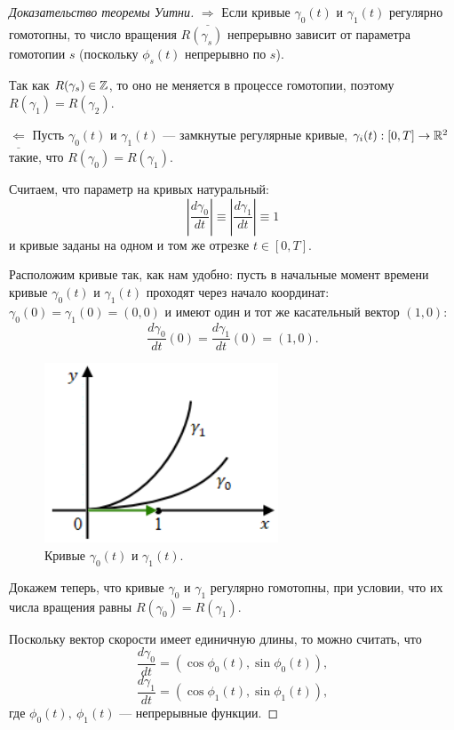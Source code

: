\begin{proof}[Доказательство теоремы Уитни]
    $\underline{\Longrightarrow}$ 
    Если кривые $\gamma_0(t)$ и $\gamma_1(t)$ регулярно гомотопны, то число вращения $R(\gamma_s)$ непрерывно зависит от параметра гомотопии $s$ (поскольку $\phi_s(t)$ непрерывно по $s$).

    Так как $R(\gamma_s) \in \mathbb{Z}$, то оно не меняется в процессе гомотопии, поэтому $R(\gamma_1) = R(\gamma_2)$.

    $\underline{\Longleftarrow}$ 
    Пусть $\gamma_0(t)$ и $\gamma_1(t)$ — замкнутые регулярные кривые, $\gamma_i(t): [0,T] \to \mathbb{R}^2$ такие, что $R(\gamma_0) = R(\gamma_1)$.

    Считаем, что параметр на кривых натуральный:
    \[\left|\frac{d\gamma_0}{dt}\right| \equiv \left|\frac{d\gamma_1}{dt}\right| \equiv 1\]
    и кривые заданы на одном и том же отрезке $t \in [0,T]$.

    Расположим кривые так, как нам удобно: пусть в начальные момент времени кривые $\gamma_0(t)$ и $\gamma_1(t)$ проходят через начало координат: $\gamma_0(0) = \gamma_1(0) = (0,0)$ и имеют один и тот же касательный вектор $(1,0)$:
    \[\frac{d\gamma_0}{dt}(0) = \frac{d\gamma_1}{dt}(0) = (1,0).\]

    \begin{figure}[htbp]
        \centering
        \includegraphics[scale=0.7]{images/c13.1.png}
        \caption{Кривые $\gamma_0(t)$ и $\gamma_1(t)$.}
        \label{fig:c13.1}
    \end{figure}

    Докажем теперь, что кривые $\gamma_0$ и $\gamma_1$ регулярно гомотопны, при условии, что их числа вращения равны $R(\gamma_0) = R(\gamma_1)$.

    Поскольку вектор скорости имеет единичную длины, то можно считать, что
    \[\frac{d\gamma_0}{dt} = (\cos{\phi_0(t)}, \sin{\phi_0(t)}),\]
    \[\frac{d\gamma_1}{dt} = (\cos{\phi_1(t)}, \sin{\phi_1(t)}),\]
    где $\phi_0(t), \ \phi_1(t)$ — непрерывные функции.


\end{proof}
